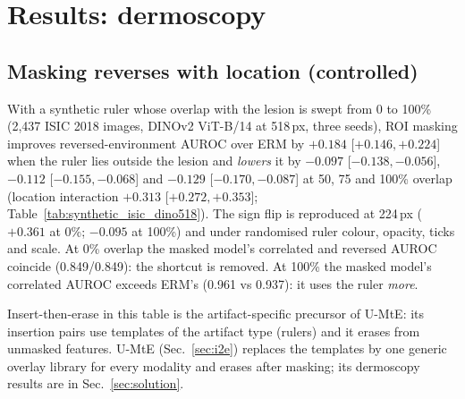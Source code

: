 \section{Results: dermoscopy}\label{sec:derm}

\subsection{Masking reverses with location (controlled)}
With a synthetic ruler whose overlap with the lesion is swept from 0 to 100\% (2,437 ISIC 2018 images,
DINOv2 ViT-B/14 at 518\,px, three seeds), ROI masking improves reversed-environment AUROC over ERM by
$+0.184$ [$+0.146, +0.224$] when the ruler lies outside the lesion and \emph{lowers} it by $-0.097$
[$-0.138, -0.056$], $-0.112$ [$-0.155, -0.068$] and $-0.129$ [$-0.170, -0.087$] at 50, 75 and 100\% overlap
(location interaction $+0.313$ [$+0.272, +0.353$]; Table~\ref{tab:synthetic_isic_dino518}). The sign flip is
reproduced at 224\,px ($+0.361$ at 0\%; $-0.095$ at 100\%) and under randomised ruler colour, opacity, ticks and
scale. At 0\% overlap the masked model's correlated and reversed AUROC coincide (0.849/0.849): the shortcut is
removed. At 100\% the masked model's correlated AUROC exceeds ERM's (0.961 vs 0.937): it uses the ruler \emph{more}.


Insert-then-erase in this table is the artifact-specific precursor of U-MtE: its insertion pairs use templates of the
artifact type (rulers) and it erases from unmasked features. U-MtE (Sec.~\ref{sec:i2e}) replaces the templates by
one generic overlay library for every modality and erases after masking; its dermoscopy results are in
Sec.~\ref{sec:solution}.

